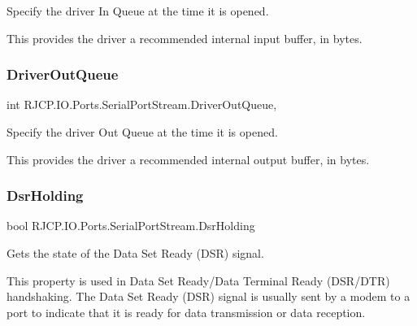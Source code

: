 Specify the driver In Queue at the time it is opened. 

This provides the driver a recommended internal input buffer, in bytes. \mbox{\label{class_r_j_c_p_1_1_i_o_1_1_ports_1_1_serial_port_stream_a9cbf475704653f8ebc56d21e9b22aae0}} 
\subsubsection{\texorpdfstring{DriverOutQueue}{DriverOutQueue}}
{\footnotesize\ttfamily int R\+J\+C\+P.\+I\+O.\+Ports.\+Serial\+Port\+Stream.\+Driver\+Out\+Queue\hspace{0.3cm}{\ttfamily [get]}, {\ttfamily [set]}}



Specify the driver Out Queue at the time it is opened. 

This provides the driver a recommended internal output buffer, in bytes. \mbox{\label{class_r_j_c_p_1_1_i_o_1_1_ports_1_1_serial_port_stream_ae0b63bbec7700825cc67c9a2d31d3649}} 
\subsubsection{\texorpdfstring{DsrHolding}{DsrHolding}}
{\footnotesize\ttfamily bool R\+J\+C\+P.\+I\+O.\+Ports.\+Serial\+Port\+Stream.\+Dsr\+Holding\hspace{0.3cm}{\ttfamily [get]}}



Gets the state of the Data Set Ready (D\+SR) signal. 

This property is used in Data Set Ready/\+Data Terminal Ready (D\+S\+R/\+D\+TR) handshaking. The Data Set Ready (D\+SR) signal is usually sent by a modem to a port to indicate that it is ready for data transmission or data reception. \mbox{\label{class_r_j_c_p_1_1_i_o_1_1_ports_1_1_serial_port_stream_ae033eb3641b73520ed03aeae0f64abb0}} 
